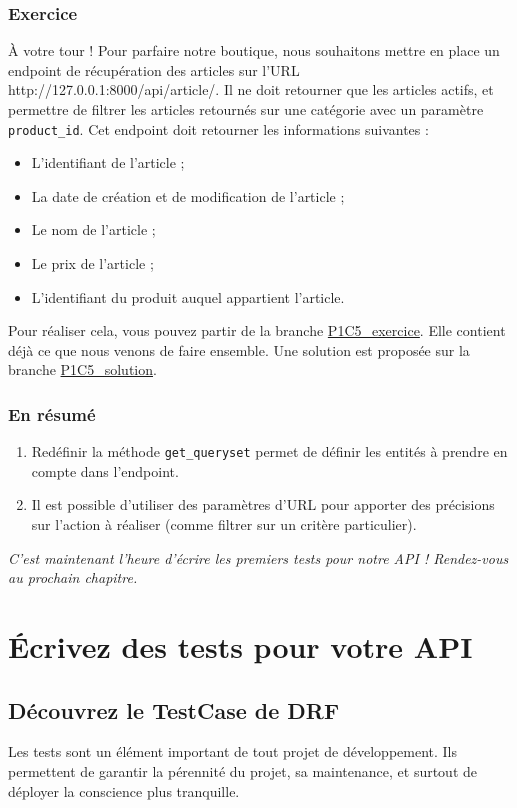 \subsubsection*{Exercice}
À votre tour ! Pour parfaire notre boutique, nous souhaitons mettre en place un endpoint de récupération des articles sur l’URL http://127.0.0.1:8000/api/article/. Il ne doit retourner que les articles actifs, et permettre de filtrer les articles retournés sur une catégorie avec un paramètre {\tt product\_id}.
Cet endpoint doit retourner les informations suivantes :
\begin{itemize}
\item L’identifiant de l’article ;
\item La date de création et de modification de l’article ;
\item Le nom de l’article ;
\item Le prix de l’article ;
\item L’identifiant du produit auquel appartient l’article.
\end{itemize}
Pour réaliser cela, vous pouvez partir de la branche \href{https://github.com/OpenClassrooms-Student-Center/7192416\_APIs\_DRF/tree/P1C5\_exercice}{P1C5\_exercice}. Elle contient déjà ce que nous venons de faire ensemble. Une solution est proposée sur la branche \href{https://github.com/OpenClassrooms-Student-Center/7192416\_APIs\_DRF/tree/P1C5\_solution}{P1C5\_solution}.

\subsubsection*{En résumé}
\begin{enumerate}
\item Redéfinir la méthode {\tt get\_queryset}  permet de définir les entités à prendre en compte dans l'endpoint.
\item Il est possible d’utiliser des paramètres d’URL pour apporter des précisions sur l’action à réaliser (comme filtrer sur un critère particulier).
\end{enumerate}

{\em C’est maintenant l’heure d’écrire les premiers tests pour notre API ! Rendez-vous au prochain chapitre.}

\section{Écrivez des tests pour votre API}
\subsection{Découvrez le TestCase de DRF}
Les tests sont un élément important de tout projet de développement. Ils permettent de garantir la pérennité du projet, sa maintenance, et surtout de déployer la conscience plus tranquille.

